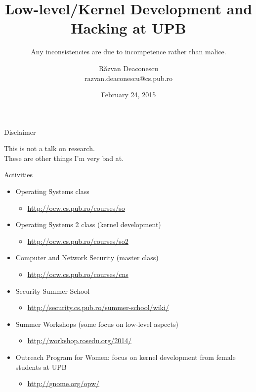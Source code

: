 \documentclass{simple}
\title[Low-level/Hacking @UPB]{Low-level/Kernel Development and Hacking at
UPB}
\subtitle{Any inconsistencies are due to incompetence rather than malice.}
\institute{EPFL Visit, Les Diablerets}
\author[Răzvan Deaconescu]{Răzvan Deaconescu\\
  razvan.deaconescu@cs.pub.ro}
\date{February 24, 2015}
\begin{document}
\begin{frame}{Disclaimer}
  \begin{center}
    \Large
    This is not a talk on research. \\
    These are other things I'm very bad at.
  \end{center}
\end{frame}

\frame{\titlepage}

\begin{frame}{Activities}
  \begin{itemize}
    \pause \item Operating Systems class
      \begin{itemize}
        \item \url{http://ocw.cs.pub.ro/courses/so}
      \end{itemize}
    \pause \item Operating Systems 2 class (kernel development)
      \begin{itemize}
        \item \url{http://ocw.cs.pub.ro/courses/so2}
      \end{itemize}
    \pause \item Computer and Network Security (master class)
      \begin{itemize}
        \item \url{http://ocw.cs.pub.ro/courses/cns}
      \end{itemize}
    \pause \item Security Summer School
      \begin{itemize}
        \item \url{http://security.cs.pub.ro/summer-school/wiki/}
      \end{itemize}
    \pause \item Summer Workshops (some focus on low-level aspects)
      \begin{itemize}
        \item \url{http://workshop.rosedu.org/2014/}
      \end{itemize}
    \pause \item Outreach Program for Women: focus on kernel development from
      female students at UPB
      \begin{itemize}
        \item \url{http://gnome.org/opw/}
      \end{itemize}
  \end{itemize}
\end{frame}
\end{document}

